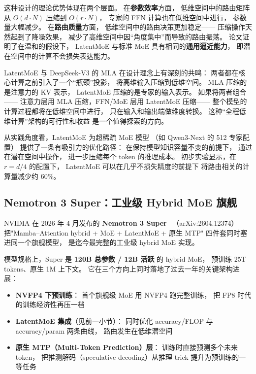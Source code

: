 这种设计的理论优势体现在两个层面。
在\textbf{参数效率}方面，
低维空间中的路由矩阵从 $O(d \cdot N)$ 压缩到 $O(r \cdot N)$，
专家的 FFN 计算也在低维空间中进行，
参数量大幅减少。
在\textbf{路由质量}方面，
低维空间中的路由决策更加稳定——
压缩操作天然起到了降噪效果，
减少了高维空间中因“角度集中”而导致的路由振荡。
论文证明了在温和的假设下，
LatentMoE 与标准 MoE 具有相同的\textbf{通用逼近能力}，
即潜在空间中的计算不会损失表达能力。

LatentMoE 与 DeepSeek-V3 的 MLA 在设计理念上有深刻的共鸣：
两者都在核心计算之前引入了一个“瓶颈”投影，
将高维输入压缩到低维空间。
MLA 压缩的是注意力的 KV 表示，
LatentMoE 压缩的是专家的输入表示。
如果将两者组合——
注意力层用 MLA 压缩，FFN/MoE 层用 LatentMoE 压缩——
整个模型的计算过程都将在低维空间中进行，
只在输入和输出端做维度转换。
这种“全程低维计算”架构的可行性和收益
是一个值得探索的方向。

从实践角度看，LatentMoE 为超稀疏 MoE 模型
（如 Qwen3-Next 的 512 专家配置）
提供了一条有吸引力的优化路径：
在保持模型知识容量不变的前提下，
通过在潜在空间中操作，
进一步压缩每个 token 的推理成本。
初步实验显示，在 $r = d/4$ 的配置下，
LatentMoE 可以在几乎不损失精度的前提下
将路由相关的计算量减少约 60\%。

\subsection{Nemotron 3 Super：工业级 Hybrid MoE 旗舰}
\label{sec:nemotron3super}

NVIDIA 在 2026 年 4 月发布的
\textbf{Nemotron 3 Super}~\cite{nemotron3super2026}
（arXiv:2604.12374）
把"Mamba--Attention hybrid + MoE + LatentMoE + 原生 MTP"
四件套同时塞进同一个旗舰模型，
是迄今最完整的工业级 hybrid MoE 实现。

模型规格上，Super 是 \textbf{120B 总参数 / 12B 活跃}
的 hybrid MoE，
预训练 25T tokens、原生 1M 上下文。
它在三个方向上同时落地了过去一年的关键架构进展：

\begin{itemize}[noitemsep]
  \item \textbf{NVFP4 下预训练}：
        首个旗舰级 MoE 用 NVFP4 跑完整训练，
        把 FP8 时代的训练经济性再压一档
  \item \textbf{LatentMoE 集成}（见前一小节）：
        同时优化 accuracy/FLOP 与 accuracy/param 两条曲线，
        路由发生在低维潜空间
  \item \textbf{原生 MTP（Multi-Token Prediction）层}：
        训练时直接预测多个未来 token，
        把推测解码（speculative decoding）从推理 trick
        提升为预训练的一等任务
\end{itemize}

